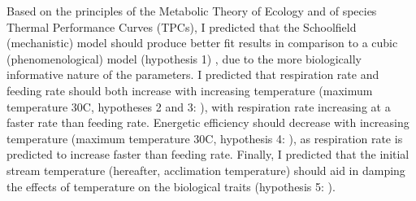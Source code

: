 \documentclass[../../Paper.tex]{subfiles}
\begin{document}
Based on the principles of the Metabolic Theory of Ecology and of species Thermal Performance Curves (TPCs),
I predicted that the Schoolfield (mechanistic) model should produce better fit results in comparison to
a cubic (phenomenological) model (hypothesis 1) , due to the more biologically informative nature of the parameters.
I predicted that respiration rate and feeding rate should both increase with increasing temperature
(maximum temperature 30\degree C, hypotheses 2 and 3:
\cite{gillooly_effects_2001}), with respiration rate increasing at a faster rate than feeding rate. 
Energetic efficiency should decrease with increasing temperature (maximum temperature 30\degree C, hypothesis 4: \cite{savage_effects_2004}), as
respiration rate is predicted to increase faster than feeding rate. Finally, I predicted that the initial stream temperature
(hereafter, acclimation temperature) should aid in damping the effects of temperature on the biological traits (hypothesis 5: \cite{marshall_warming_2011}).







\end{document}
